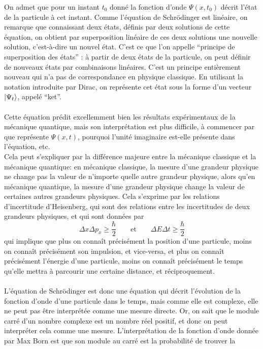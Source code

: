 On admet que pour un instant $t_0$ donné la fonction d’onde $\Psi (x, t_0)$ décrit l’état de la particule
à cet instant.
Comme l’équation de Schrödinger est linéaire, on remarque que connaissant deux états, définis par deux solutions
de cette équation, on obtient par superposition linéaire de ces deux solutions une nouvelle solution, c'est-à-dire
un nouvel état.
C’est ce que l’on appelle ``principe de superposition des états'' : à partir de deux états de la particule, on
peut définir de nouveaux états par combinaisons linéaires.
C’est un principe entièrement nouveau qui n’a pas de correspondance en physique classique.
En utilisant la notation introduite par Dirac, on représente cet état sous la forme d’un vecteur $\ket{\Psi_t}$,
appelé ``ket''.\\ \\
Cette équation prédit excellemment bien les résultats expérimentaux de la mécanique quantique, mais son
interprétation est plus difficile, à commencer par que représente $\Psi (x,t)$, pourquoi l'unité imaginaire
est-elle présente dans l'équation, etc.\\
Cela peut s'expliquer par la différence majeure entre la mécanique classique et la mécanique quantique:
en mécanique classique, la mesure d'une grandeur physique ne change pas la valeur de n'importe quelle autre
grandeur physique, alors qu'en mécanique quantique, la mesure d'une grandeur physique change la valeur
de certaines autres grandeurs physiques.
Cela s'exprime par les relations d'incertitude d'Heisenberg, qui sont des relations entre les incertitudes
de deux grandeurs physiques, et qui sont données par
\[
    \Delta x \Delta p_x \geq \frac{\hbar}{2} \qquad \text{et} \qquad \Delta E \Delta t \geq \frac{\hbar}{2}
\]
qui implique que plus on connaît précisément la position d'une particule, moins on connaît précisément
son impulsion, et vice-versa, et plus on connaît précisément l'énergie d'une particule, moins on connaît
précisément le temps qu'elle mettra à parcourir une certaine distance, et réciproquement.\\ \\
L'équation de Schrödinger est donc une équation qui décrit l'évolution de la fonction d'onde d'une particule
dans le temps, mais comme elle est complexe, elle ne peut pas être interprétée comme une mesure directe.
Or, on sait que le module carré d'un nombre complexe est un nombre réel positif, et donc on peut interpréter
cela comme une mesure.
L'interprétation de la fonction d'onde donnée par Max Born est que son module au carré est la probabilité de trouver la
